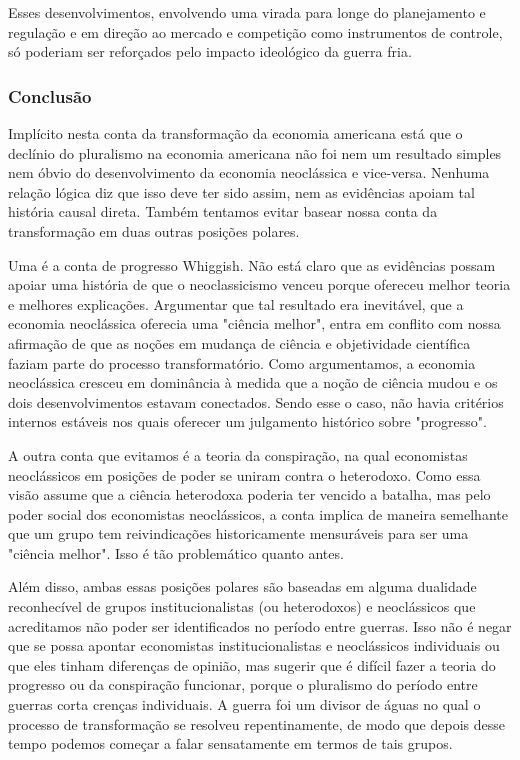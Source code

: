 \documentclass[12pt]{article}
\begin{document}
Esses desenvolvimentos, envolvendo uma virada para longe do planejamento e regulação e em direção ao mercado e competição como instrumentos de controle, só poderiam ser reforçados pelo impacto ideológico da guerra fria.

\subsubsection{\textbf{Conclusão}}
Implícito nesta conta da transformação da economia americana está que o declínio do pluralismo na economia americana não foi nem um resultado simples nem óbvio do desenvolvimento da economia neoclássica e vice-versa. Nenhuma relação lógica diz que isso deve ter sido assim, nem as evidências apoiam tal história causal direta. Também tentamos evitar basear nossa conta da transformação em duas outras posições polares.

Uma é a conta de progresso Whiggish. Não está claro que as evidências possam apoiar uma história de que o neoclassicismo venceu porque ofereceu melhor teoria e melhores explicações. Argumentar que tal resultado era inevitável, que a economia neoclássica oferecia uma "ciência melhor", entra em conflito com nossa afirmação de que as noções em mudança de ciência e objetividade científica faziam parte do processo transformatório. Como argumentamos, a economia neoclássica cresceu em dominância à medida que a noção de ciência mudou e os dois desenvolvimentos estavam conectados. Sendo esse o caso, não havia critérios internos estáveis nos quais oferecer um julgamento histórico sobre "progresso".

A outra conta que evitamos é a teoria da conspiração, na qual economistas neoclássicos em posições de poder se uniram contra o heterodoxo. Como essa visão assume que a ciência heterodoxa poderia ter vencido a batalha, mas pelo poder social dos economistas neoclássicos, a conta implica de maneira semelhante que um grupo tem reivindicações historicamente mensuráveis para ser uma "ciência melhor". Isso é tão problemático quanto antes.

Além disso, ambas essas posições polares são baseadas em alguma dualidade reconhecível de grupos institucionalistas (ou heterodoxos) e neoclássicos que acreditamos não poder ser identificados no período entre guerras. Isso não é negar que se possa apontar economistas institucionalistas e neoclássicos individuais ou que eles tinham diferenças de opinião, mas sugerir que é difícil fazer a teoria do progresso ou da conspiração funcionar, porque o pluralismo do período entre guerras corta crenças individuais. A guerra foi um divisor de águas no qual o processo de transformação se resolveu repentinamente, de modo que depois desse tempo podemos começar a falar sensatamente em termos de tais grupos.
\end{document}
